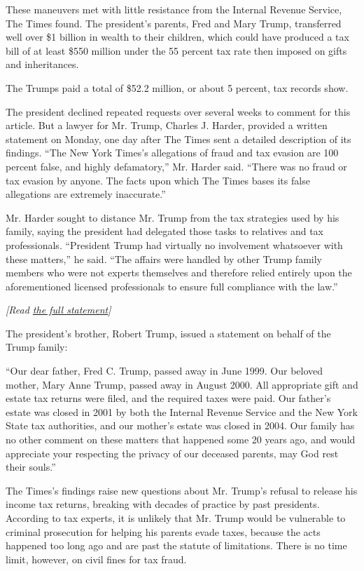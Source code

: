 These maneuvers met with little resistance from the Internal Revenue
Service, The Times found. The president's parents, Fred and Mary Trump,
transferred well over \$1 billion in wealth to their children, which
could have produced a tax bill of at least \$550 million under the 55
percent tax rate then imposed on gifts and inheritances.

The Trumps paid a total of \$52.2 million, or about 5 percent, tax
records show.

The president declined repeated requests over several weeks to comment
for this article. But a lawyer for Mr. Trump, Charles J. Harder,
provided a written statement on Monday, one day after The Times sent a
detailed description of its findings. ``The New York Times's allegations
of fraud and tax evasion are 100 percent false, and highly defamatory,''
Mr. Harder said. ``There was no fraud or tax evasion by anyone. The
facts upon which The Times bases its false allegations are extremely
inaccurate.''

Mr. Harder sought to distance Mr. Trump from the tax strategies used by
his family, saying the president had delegated those tasks to relatives
and tax professionals. ``President Trump had virtually no involvement
whatsoever with these matters,'' he said. ``The affairs were handled by
other Trump family members who were not experts themselves and therefore
relied entirely upon the aforementioned licensed professionals to ensure
full compliance with the law.''

\emph{{[}Read
\href{https://int.nyt.com/data/documenthelper/353-trump-inheritance-taxes-statement/2986a100d3d19a917cdc/optimized/full.pdf\#page=1?action=click\&module=Intentional\&pgtype=Article}{the
full statement}{]}}

The president's brother, Robert Trump, issued a statement on behalf of
the Trump family:

``Our dear father, Fred C. Trump, passed away in June 1999. Our beloved
mother, Mary Anne Trump, passed away in August 2000. All appropriate
gift and estate tax returns were filed, and the required taxes were
paid. Our father's estate was closed in 2001 by both the Internal
Revenue Service and the New York State tax authorities, and our mother's
estate was closed in 2004. Our family has no other comment on these
matters that happened some 20 years ago, and would appreciate your
respecting the privacy of our deceased parents, may God rest their
souls.''

The Times's findings raise new questions about Mr. Trump's refusal to
release his income tax returns, breaking with decades of practice by
past presidents. According to tax experts, it is unlikely that Mr. Trump
would be vulnerable to criminal prosecution for helping his parents
evade taxes, because the acts happened too long ago and are past the
statute of limitations. There is no time limit, however, on civil fines
for tax fraud.


